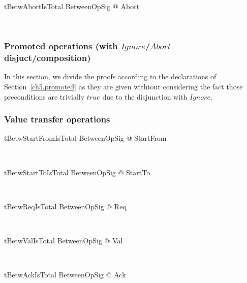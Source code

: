 \begin{LNewThm}
\begin{theorem}{tBetwAbortIsTotal}
   \forall BetweenOpSig @ \pre Abort
\end{theorem}~\end{LNewThm}

\subsubsection{Promoted operations (with $Ignore$/$Abort$ disjuct/composition)}

In this section, we divide the proofs according to the declarations of Section~\ref{ch5.promoted}
as they are given withtout considering the fact those preconditions are trivially $true$ due to the
disjunction with $Ignore$.

\subsubsection*{Value transfer operations}

\begin{LNewThm}
\begin{theorem}{tBetwStartFromIsTotal}
   \forall BetweenOpSig @ \pre StartFrom
\end{theorem}~\end{LNewThm}

\begin{LNewThm}
\begin{theorem}{tBetwStartToIsTotal}
   \forall BetweenOpSig @ \pre StartTo
\end{theorem}~\end{LNewThm}

\begin{LNewThm}
\begin{theorem}{tBetwReqIsTotal}
   \forall BetweenOpSig @ \pre Req
\end{theorem}~\end{LNewThm}

\begin{LNewThm}
\begin{theorem}{tBetwValIsTotal}
   \forall BetweenOpSig @ \pre Val
\end{theorem}~\end{LNewThm}

\begin{LNewThm}
\begin{theorem}{tBetwAckIsTotal}
   \forall BetweenOpSig @ \pre Ack
\end{theorem}~\end{LNewThm}

